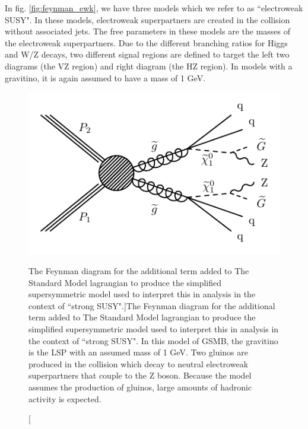   In fig. \ref{fig:feynman_ewk}, we have three models which we refer to as ``electroweak SUSY". In these models, electroweak superpartners are created in the collision without associated jets. The free parameters in these models are the masses of the electroweak superpartners. Due to the different branching ratios for Higgs and W/Z decays, two different signal regions are defined to target the left two diagrams (the VZ region) and right diagram (the HZ region). In models with a gravitino, it is again assumed to have a mass of 1 GeV.

  \begin{figure}[h!]
    \centering
    \includegraphics[width=.5\textwidth]{figures/diagrams/T5ZZ.pdf}
    \caption[The Feynman diagram for the additional term added to The Standard Model lagrangian to produce the simplified supersymmetric model used to interpret this in analysis in the context of ``strong SUSY".]{The Feynman diagram for the additional term added to The Standard Model lagrangian to produce the simplified supersymmetric model used to interpret this in analysis in the context of ``strong SUSY". In this model of GSMB, the gravitino is the LSP with an assumed mass of 1 GeV. Two gluinos are produced in the collision which decay to neutral electroweak superpartners that couple to the Z boson. Because the model assumes the production of gluinos, large amounts of hadronic activity is expected.}
    \label{fig:feynman_str}
  \end{figure}

